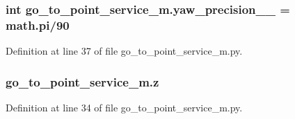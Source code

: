 \subsubsection[{\texorpdfstring{yaw\+\_\+precision\+\_\+2\+\_\+}{yaw_precision_2_}}]{\setlength{\rightskip}{0pt plus 5cm}int go\+\_\+to\+\_\+point\+\_\+service\+\_\+m.\+yaw\+\_\+precision\+\_\+\_\+ = math.\+pi/90}\hypertarget{namespacego__to__point__service__m_aa642aefafe9c9c963a86f01c5a256e23}{}\label{namespacego__to__point__service__m_aa642aefafe9c9c963a86f01c5a256e23}


Definition at line 37 of file go\+\_\+to\+\_\+point\+\_\+service\+\_\+m.\+py.

\subsubsection[{\texorpdfstring{z}{z}}]{\setlength{\rightskip}{0pt plus 5cm}go\+\_\+to\+\_\+point\+\_\+service\+\_\+m.\+z}\hypertarget{namespacego__to__point__service__m_aa0ed9dc81f0153863a2a971384dbcba3}{}\label{namespacego__to__point__service__m_aa0ed9dc81f0153863a2a971384dbcba3}


Definition at line 34 of file go\+\_\+to\+\_\+point\+\_\+service\+\_\+m.\+py.

